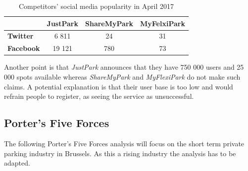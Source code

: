 \documentclass[12pt,a4paper,oneside]{book}
\begin{document}
\begin{table}[h]
\centering
\caption{Competitors' social media popularity in April 2017}
\label{smp}
\begin{tabular}{@{}lccc@{}}
\toprule
\textbf{}         & JustPark & ShareMyPark & MyFelxiPark \\ \midrule
\textbf{Twitter}  & 6 811    & 24          & 31          \\ \midrule
\textbf{Facebook} & 19 121   & 780         & 73          \\ \bottomrule
\end{tabular}
\end{table}

Another point is that \textit{JustPark} announces that they have 750 000 users\cite{jpu} and 25 000 spots available\cite{jpd} whereas \textit{ShareMyPark} and \textit{MyFlexiPark} do not make such claims. A potential explanation is that their user base is too low and would refrain people to register, as seeing the service as unsuccessful.



\subsection{Porter's Five Forces}
The following Porter's Five Forces analysis will focus on the short term private parking industry in Brussels. As this a rising industry the analysis has to be adapted.\\
\end{document}
